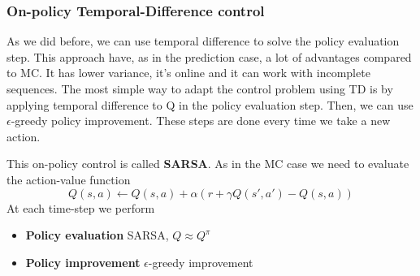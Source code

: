 \documentclass[../main.tex]{subfiles}
\begin{document}
\subsubsection{On-policy Temporal-Difference control}
As we did before, we can use temporal difference to solve the policy evaluation step. This approach have, as in the prediction case, a lot of advantages compared to MC. It has lower variance, it's online and it can work with incomplete sequences.
The most simple way to adapt the control problem using TD is by applying temporal difference to Q in the policy evaluation step. Then, we can use $\epsilon$-greedy policy improvement. These steps are done every time we take a new action.
\par \noindent
This on-policy control is called \textbf{SARSA}\footnotemark. As in the MC case we need to evaluate the action-value function
\begin{equation*}
    Q(s,a) \leftarrow Q(s,a) + \alpha(r + \gamma Q(s',a') - Q(s,a))
\end{equation*}
At each time-step we perform
\begin{itemize}
    \item \textbf{Policy evaluation} SARSA, $Q \approx Q^{\pi}$
    \item \textbf{Policy improvement} $\epsilon$-greedy improvement
\end{itemize}
\end{document}
